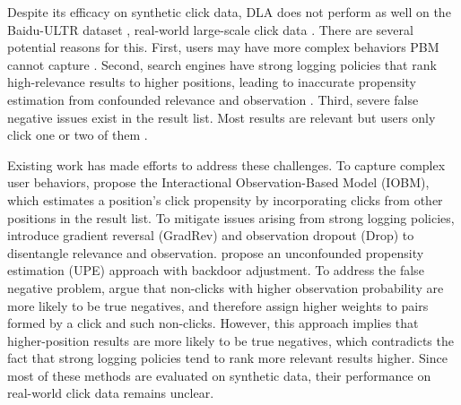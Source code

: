 
Despite its efficacy on synthetic click data, DLA does not perform as well on the Baidu-ULTR dataset \cite{zou2022large}, real-world large-scale click data \cite{hager2024unbiased}. There are several potential reasons for this. First, users may have more complex behaviors PBM cannot capture \cite{zou2022large}. Second, search engines have strong logging policies that rank high-relevance results to higher positions, leading to inaccurate propensity estimation from confounded relevance and observation \cite{hager2024unbiased}. Third, severe false negative issues exist in the result list. Most results are relevant but users only click one or two of them \cite{yu2023cir}.

\enlargethispage{\baselineskip}
Existing work has made efforts to address these challenges. To capture complex user behaviors, \citet{chen2021adapting} propose the Interactional Observation-Based Model (IOBM), which estimates a position's click propensity by incorporating clicks from other positions in the result list. To mitigate issues arising from strong logging policies, \citet{zhang2023towards} introduce gradient reversal (GradRev) and observation dropout (Drop) to disentangle relevance and observation. \citet{luo2024unbiased} propose an unconfounded propensity estimation (UPE) approach with backdoor adjustment. To address the false negative problem, \citet{wang2021non} argue that non-clicks with higher observation probability are more likely to be true negatives, and therefore assign higher weights to pairs formed by a click and such non-clicks. However, this approach implies that higher-position results are more likely to be true negatives, which contradicts the fact that strong logging policies tend to rank more relevant results higher. Since most of these methods are evaluated on synthetic data, their performance on real-world click data remains unclear.

